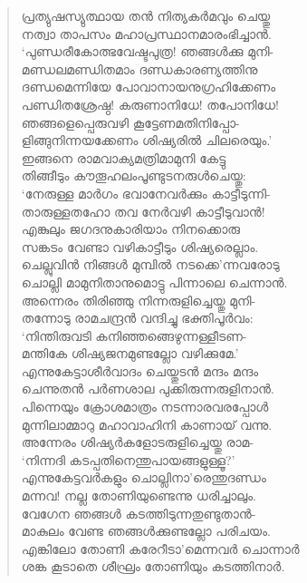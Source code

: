 \begin{verse}
പ്രത്യുഷസ്യുത്ഥായ തന്‍ നിത്യകര്‍മവും ചെയ്തു\\
നത്വാ താപസം മഹാപ്രസ്ഥാനമാരംഭിച്ചാന്‍.\\
‘പുണ്ഡരീകോത്ഭവേഷ്ടപുത്ര! ഞങ്ങള്‍ക്കു മുനി-\\
മണ്ഡലമണ്ഡിതമാം ദണ്ഡകാരണ്യത്തിനു\\
ദണ്ഡമെന്നിയേ പോവാനായനുഗ്രഹിക്കേണം\\
പണ്ഡിതശ്രേഷ്ഠ! കരുണാനിധേ! തപോനിധേ!\\
ഞങ്ങളെപ്പെരുവഴി കൂട്ടേണമതിനിപ്പോ-\\
ളിങ്ങുനിന്നയക്കേണം ശിഷ്യരില്‍ ചിലരെയും.’\\
ഇങ്ങനെ രാമവാക്യമത്രിമാമുനി കേട്ടു\\
തിങ്ങീടും കൗതൂഹലംപൂണ്ടുടനരുള്‍ചെയ്തു:\\
‘നേരുള്ള മാര്‍ഗം ഭവാനേവര്‍ക്കും കാട്ടീടുന്നി-\\
താരുള്ളതഹോ തവ നേര്‍വഴി കാട്ടീടുവാന്‍!\\
എങ്കുലും ജഗദനുകാരിയാം നിനക്കൊരു\\
സങ്കടം വേണ്ടാ വഴികാട്ടീടും ശിഷ്യരെല്ലാം.\\
ചെല്ലുവിന്‍ നിങ്ങള്‍ മുമ്പില്‍ നടക്കെ’ന്നവരോടു\\
ചൊല്ലി മാമുനിതാനുമൊട്ടു പിന്നാലെ ചെന്നാന്‍.\\
അന്നെരം തിരിഞ്ഞു നിന്നരുളിച്ചെയ്തു മുനി-\\
തന്നോടു രാമചന്ദ്രന്‍ വന്ദിച്ചു ഭക്തിപൂര്‍വം:\\
‘നിന്തിരുവടി കനിഞ്ഞങ്ങെഴുന്നള്ളീടണ-\\
മന്തികേ ശിഷ്യജനമുണ്ടല്ലോ വഴിക്കുമേ.’\\
എന്നുകേട്ടാശീര്‍വാദം ചെയ്തുടന്‍ മന്ദം മന്ദം\\
ചെന്നുതന്‍ പര്‍ണശാല പുക്കിരുന്നരുളിനാന്‍.\\
പിന്നെയും ക്രോശമാത്രം നടന്നാരവരപ്പോള്‍\\
മുന്നിലാമ്മാറു മഹാവാഹിനി കാണായ് വന്നു.\\
അന്നേരം ശിഷ്യര്‍കളോടരുളിച്ചെയ്തു രാമ-\\
‘നിന്നദി കടപ്പതിനെന്തുപായങ്ങളുള്ളൂ?’\\
എന്നുകേട്ടവര്‍കളും ചൊല്ലിനാ’രെന്തുദണ്ഡം\\
മന്നവ! നല്ല തോണിയുണ്ടെന്നു ധരിച്ചാലും.\\
വേഗേന ഞങ്ങള്‍ കടത്തിടുന്നതുണ്ടുതാന്‍-\\
മാകുലം വേണ്ട ഞങ്ങള്‍ക്കുണ്ടല്ലോ പരിചയം.\\
എങ്കിലോ തോണി കരേറീടാ’മെന്നവര്‍ ചൊന്നാര്‍\\
ശങ്ക കൂടാതെ ശീഘ്രം തോണിയും കടത്തിനാര്‍.\\

\end{verse}
